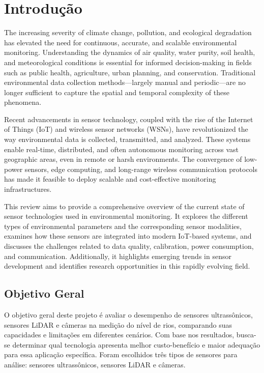\chapter{Introdução} \label{cap:intro}

The increasing severity of climate change, pollution, and ecological degradation has elevated the need for continuous, accurate, and scalable environmental monitoring. Understanding the dynamics of air quality, water purity, soil health, and meteorological conditions is essential for informed decision-making in fields such as public health, agriculture, urban planning, and conservation. Traditional environmental data collection methods—largely manual and periodic—are no longer sufficient to capture the spatial and temporal complexity of these phenomena.

Recent advancements in sensor technology, coupled with the rise of the Internet of Things (IoT) and wireless sensor networks (WSNs), have revolutionized the way environmental data is collected, transmitted, and analyzed. These systems enable real-time, distributed, and often autonomous monitoring across vast geographic areas, even in remote or harsh environments. The convergence of low-power sensors, edge computing, and long-range wireless communication protocols has made it feasible to deploy scalable and cost-effective monitoring infrastructures.

This review aims to provide a comprehensive overview of the current state of sensor technologies used in environmental monitoring. It explores the different types of environmental parameters and the corresponding sensor modalities, examines how these sensors are integrated into modern IoT-based systems, and discusses the challenges related to data quality, calibration, power consumption, and communication. Additionally, it highlights emerging trends in sensor development and identifies research opportunities in this rapidly evolving field.

\section{Objetivo Geral}

O objetivo geral deste projeto é avaliar o desempenho de sensores ultrassônicos, sensores LiDAR e câmeras na medição do nível de rios, comparando suas capacidades e limitações em diferentes cenários. Com base nos resultados, busca-se determinar qual tecnologia apresenta melhor custo-benefício e maior adequação para essa aplicação específica.
Foram escolhidos três tipos de sensores para análise: sensores ultrassônicos, sensores LiDAR e câmeras.

